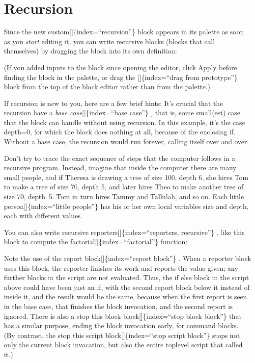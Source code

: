 \documentclass[
  letterpaper,
]{book}
\begin{document}
\section{Recursion}\label{recursion}

Since the new custom{[}{]}\{index=``recursion''\} block appears in its
palette as soon as you \emph{start} editing it, you can write recursive
blocks (blocks that call themselves) by dragging the block into its own
definition:

(If you added inputs to the block since opening the editor, click Apply
before finding the block in the palette, or drag the
{[}{]}\{index=``drag from prototype''\} block from the top of the block
editor rather than from the palette.)

If recursion is new to you, here are a few brief hints: It's crucial
that the recursion have a \emph{base case}{[}{]}\{index=``base case''\}
\emph{,} that is, some small(est) case that the block can handle without
using recursion. In this example, it's the case depth=0, for which the
block does nothing at all, because of the enclosing if. Without a base
case, the recursion would run forever, calling itself over and over.

Don't try to trace the exact sequence of steps that the computer follows
in a recursive program. Instead, imagine that inside the computer there
are many small people, and if Theresa is drawing a tree of size 100,
depth 6, she hires Tom to make a tree of size 70, depth 5, and later
hires Theo to make another tree of size 70, depth~5. Tom in turn hires
Tammy and Tallulah, and so on. Each little person{[}{]}\{index=``little
people''\} has his or her own local variables size and depth, each with
different values.

You can also write recursive reporters{[}{]}\{index=``reporters,
recursive''\} , like this block to compute the
factorial{[}{]}\{index=``factorial''\} function:

Note the use of the report block{[}{]}\{index=``report block''\} . When
a reporter block uses this block, the reporter finishes its work and
reports the value given; any further blocks in the script are not
evaluated. Thus, the if else block in the script above could have been
just an if, with the second report block below it instead of inside it,
and the result would be the same, because when the ﬁrst report is seen
in the base case, that finishes the block invocation, and the second
report is ignored. There is also a stop this block
block{[}{]}\{index=``stop block block''\} that has a similar purpose,
ending the block invocation early, for command blocks. (By contrast, the
stop this script block{[}{]}\{index=``stop script block''\} stops not
only the current block invocation, but also the entire toplevel script
that called it.)
\end{document}
